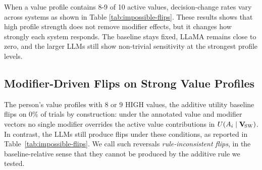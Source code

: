 \documentclass[11pt]{article}
\newcommand{\Vsw}{\mathbf{V}_{\!\textsc{SW}}}
\begin{document}

When a value profile contains 8-9 of 10 active values, decision-change rates vary across systems as shown in Table \ref{tab:impossible-flips}.
These results shows that high profile strength does not remove modifier effects, but it changes how strongly each system responds. The baseline stays fixed, LLaMA remains close to zero, and the larger LLMs still show non-trivial sensitivity at the strongest profile levels.





\subsection{Modifier-Driven Flips on Strong Value Profiles}
\label{sec:impossible}

The person's value profiles with $8$ or $9$ HIGH values, the additive utility baseline flips on $0\%$ of trials by construction: under the annotated value and modifier vectors no single modifier overrides the active value contributions in $U(A_i\mid\Vsw)$. In contrast, the LLMs still produce flips under these conditions, as reported in Table~\ref{tab:impossible-flips}. We call such reversals \emph{rule-inconsistent flips}, in the baseline-relative sense that they cannot be produced by the additive rule we tested.
\end{document}
